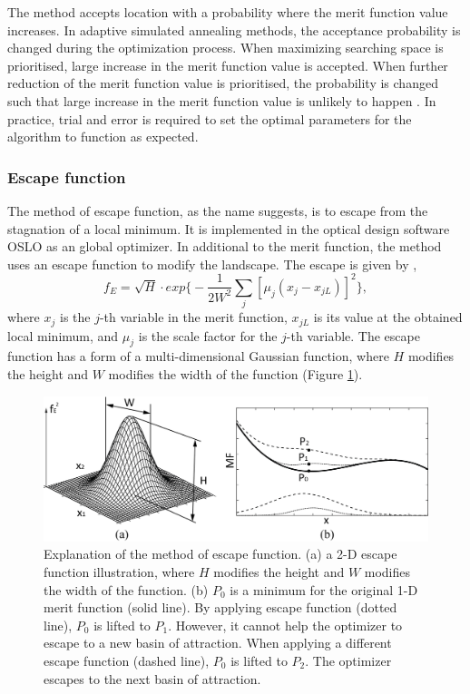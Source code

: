 The method accepts location with a probability where the merit function value increases. In adaptive simulated annealing methods, the acceptance probability is changed during the optimization process. When maximizing searching space is prioritised, large increase in the merit function value is accepted. When further reduction of the merit function value is prioritised, the probability is changed such that large increase in the merit function value is unlikely to happen \cite{Forbes1991}. In practice, trial and error is required to set the optimal parameters for the algorithm to function as expected.    

\subsubsection{Escape function}
The method of escape function, as the name suggests, is to escape from the stagnation of a local minimum. It is implemented in the optical design software OSLO \cite{OsloSW} as an global optimizer. In additional to the merit function, the method uses an escape function to modify the landscape. The escape is given by \cite{Isshiki1998},
\begin{equation}
f_{E} = \sqrt{H} \cdot exp \Bigg\{ - \frac{1}{2W^{2}}\sum_{j} \left[\mu_{j}(x_j - x_{jL}) \right]^2 \Bigg\}, 
\end{equation}where $x_j$ is the $j$-th variable in the merit function, $x_{jL}$ is its value at the obtained local minimum, and $\mu_j$ is the scale factor for the $j$-th variable. The escape function has a form of a multi-dimensional Gaussian function, where $H$ modifies the height and $W$ modifies the width of the function (Figure \ref{fig: Escape_function_explained}). 
\begin{figure}
    \centering
    \includegraphics[scale=0.58]{chapter-1/figures/EscapeFunction_explained.png}
    \caption{Explanation of the method of escape function. (a) a 2-D escape function illustration, where $H$ modifies the height and $W$ modifies the width of the function. (b) $P_0$ is a minimum for the original 1-D merit function (solid line). By applying escape function (dotted line), $P_0$ is lifted to $P_1$. However, it cannot help the optimizer to escape to a new basin of attraction. When applying a different escape function (dashed line), $P_0$ is lifted to $P_2$. The optimizer escapes to the next basin of attraction.}
    \label{fig: Escape_function_explained}
\end{figure}
